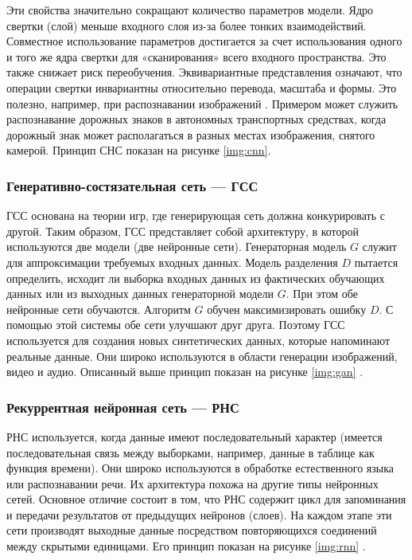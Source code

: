 Эти свойства значительно сокращают количество параметров модели. Ядро свертки (слой) меньше входного слоя из-за более тонких взаимодействий. Совместное использование параметров достигается за счет использования одного и того же ядра свертки для «сканирования» всего входного пространства. Это также снижает риск переобучения. Эквивариантные представления означают, что операции свертки инвариантны относительно перевода, масштаба и формы. Это полезно, например, при распознавании изображений \cite{introdmachlearn}. Примером может служить распознавание дорожных знаков в автономных транспортных средствах, когда дорожный знак может располагаться в разных местах изображения, снятого камерой. Принцип СНС показан на рисунке \ref{img:cnn}.


\FloatBarrier

\subsubsection{Генеративно-состязательная сеть --- ГСС}

ГСС основана на теории игр, где генерирующая сеть должна конкурировать с другой. Таким образом, ГСС представляет собой архитектуру, в которой используются две модели (две нейронные сети). Генераторная модель $G$ служит для аппроксимации требуемых входных данных. Модель разделения $D$ пытается определить, исходит ли выборка входных данных из фактических обучающих данных или из выходных данных генераторной модели $G$. При этом обе нейронные сети обучаются. Алгоритм $G$ обучен максимизировать ошибку $D$. С помощью этой системы обе сети улучшают друг друга. Поэтому ГСС используется для создания новых синтетических данных, которые напоминают реальные данные. Они широко используются в области генерации изображений, видео и аудио. Описанный выше принцип показан на рисунке \ref{img:gan} \cite{deeplearninmob}.


\FloatBarrier

\subsubsection{Рекуррентная нейронная сеть --- РНС}

РНС используется, когда данные имеют последовательный характер (имеется последовательная связь между выборками, например, данные в таблице как функция времени). Они широко используются в обработке естественного языка или распознавании речи. Их архитектура похожа на другие типы нейронных сетей. Основное отличие состоит в том, что РНС содержит цикл для запоминания и передачи результатов от предыдущих нейронов (слоев). На каждом этапе эти сети производят выходные данные посредством повторяющихся соединений между скрытыми единицами. Его принцип показан на рисунке \ref{img:rnn} \cite{deeplearninmob}.

